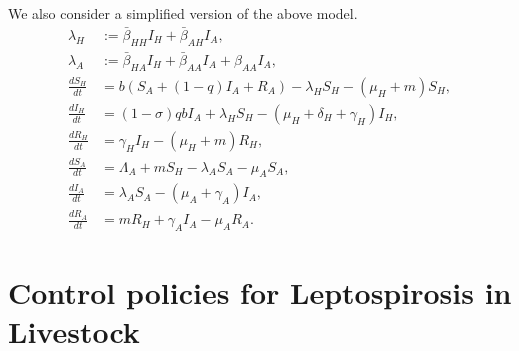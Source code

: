 \documentclass[11pt]{amsart}
\theoremstyle{definition}
\numberwithin{equation}{section}
\begin{document}
We also consider a simplified version of the above model.
    \begin{equation}\label{main_system}
        \begin{aligned}
            \lambda_H &:= \bar{\beta}_{HH} I_H + \bar{\beta}_{AH} I_A,
            \\
            \lambda_A &:= \bar{\beta}_{HA} I_H + \bar{\beta}_{AA} I_A
                + \beta_{AA} I_A,
        \\
            \frac{d S_H}{dt} &=
            b (S_A + (1 - q) I_A + R_A)
            -\lambda_H S_H - (\mu_H + m) S_H,
        \\
            \frac{d I_H}{dt} &=
            (1 - \sigma)  q  b  I_A
            + \lambda_H S_H - (\mu_H + \delta_{H} + \gamma_H)I_H,
        \\
            \frac{d R_H}{dt} &=
            \gamma_H I_H - (\mu_H + m) R_H,
        \\
            \frac{dS_A}{dt} &=
            \Lambda_A + m S_H - \lambda_A S_A - \mu_A S_A,
        \\
            \frac{d I_A}{dt} &=
            \lambda_A S_A - (\mu_A + \gamma_A)   I_A,
        \\
            \frac{dR_A}{dt} &=
            m R_H + \gamma_A I_A - \mu_A R_A.
    \end{aligned}
\end{equation}

    \section{Control policies for Leptospirosis in Livestock}
\end{document}
